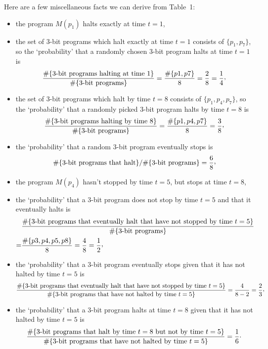 \documentclass[12pt,twoside,openright]{report}
\begin{document}
Here are a few miscellaneous facts we can derive from Table~1:
\begin{itemize}
\item the program  $M(p_{1})$ halts exactly at time $t=1$,
\item the set of 3-bit programs which halt exactly at time $t=1$ consists of $\{p_{1}, p_{7}\}$, so the `probability' that a randomly chosen 3-bit program halts at time $t=1$ is 
\[\frac{\#\{\mbox{3-bit programs halting at time 1}\}}{\#\{\mbox{3-bit programs}\}} = \frac{\#\{p1, p7\}}{8} = \frac{2}{8}=\frac{1}{4}\raisebox{0.4ex}{,}\]


\item the set of 3-bit programs which halt  by time $t=8$ consists of $\{p_{1},  p_{4}, p_{7}\}$, so the `probability' that a randomly picked  3-bit program halts by time $t=8$ is 
\[\frac{\#\{\mbox{3-bit programs halting by time 8}\}}{\#\{\mbox{3-bit programs}\}} = \frac{\#\{p1, p4, p7\}}{8} = \frac{3}{8}\raisebox{0.4ex}{,}\]

\item the `probability' that a random 3-bit program eventually stops is 
\[\#\{\mbox{3-bit programs that halt}\}/ \#\{\mbox{3-bit programs}\}=\frac{6}{8}\raisebox{0.4ex}{,}\]

\item the program  $M(p_{4})$ hasn't stopped by time $t=5$, but stops at time $t=8$,

\item the `probability' that a 3-bit program does not stop by time $t=5$ and that it eventually halts is 
\begin{align*}
  & \frac{\#\{\mbox{3-bit programs that eventually halt that have not stopped by time }t=5\}}{\#\{\mbox{3-bit programs}\}} \\
  = & \frac{\#\{p3, p4, p5, p8\}}{8} = \frac{4}{8} = \frac{1}{2}\raisebox{0.4ex}{,}
\end{align*}

\item the `probability' that a 3-bit program eventually stops given that it has not halted by time $t=5$ is 
\[\frac{\#\{\mbox{3-bit programs that eventually halt that have not stopped by time }t=5\}}{\#\{\mbox{3-bit programs that have not halted by time }t=5\}} = \frac{4}{8-2} = \frac{2}{3}\raisebox{0.4ex}{,}\]

\item the `probability' that a 3-bit program halts at time $t=8$ given that it has not halted by time $t=5$ is 
\[\frac{\#\{\mbox{3-bit programs that halt by time }t=8 \mbox{ but not by time } t=5\}}{\#\{\mbox{3-bit programs that have not halted by time }t=5\}} = \frac{1}{6}\raisebox{0.4ex}.\]
\end{itemize}
\end{document}

